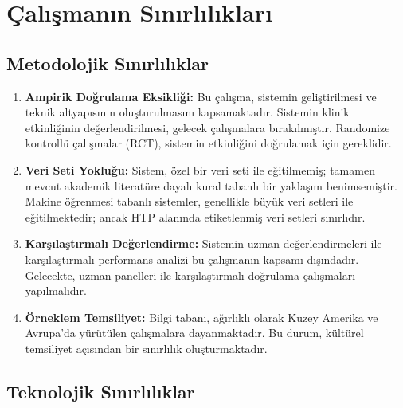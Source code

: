\section{Çalışmanın Sınırlılıkları}

\subsection{Metodolojik Sınırlılıklar}

\begin{enumerate}
  \item \textbf{Ampirik Doğrulama Eksikliği:} Bu çalışma, sistemin geliştirilmesi ve teknik altyapısının oluşturulmasını kapsamaktadır. Sistemin klinik etkinliğinin değerlendirilmesi, gelecek çalışmalara bırakılmıştır. Randomize kontrollü çalışmalar (RCT), sistemin etkinliğini doğrulamak için gereklidir.

  \item \textbf{Veri Seti Yokluğu:} Sistem, özel bir veri seti ile eğitilmemiş; tamamen mevcut akademik literatüre dayalı kural tabanlı bir yaklaşım benimsemiştir. Makine öğrenmesi tabanlı sistemler, genellikle büyük veri setleri ile eğitilmektedir; ancak HTP alanında etiketlenmiş veri setleri sınırlıdır.

  \item \textbf{Karşılaştırmalı Değerlendirme:} Sistemin uzman değerlendirmeleri ile karşılaştırmalı performans analizi bu çalışmanın kapsamı dışındadır. Gelecekte, uzman panelleri ile karşılaştırmalı doğrulama çalışmaları yapılmalıdır.

  \item \textbf{Örneklem Temsiliyet:} Bilgi tabanı, ağırlıklı olarak Kuzey Amerika ve Avrupa'da yürütülen çalışmalara dayanmaktadır. Bu durum, kültürel temsiliyet açısından bir sınırlılık oluşturmaktadır.
\end{enumerate}

\subsection{Teknolojik Sınırlılıklar}

